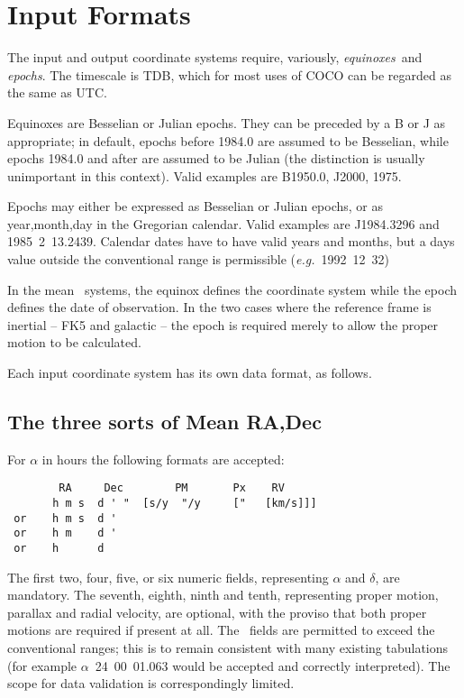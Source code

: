 \section{Input Formats}

The input and output coordinate systems require, variously,
{\it equinoxes}\, and {\it epochs}. The timescale is TDB, which
for most uses of COCO can be regarded as the same as UTC.

Equinoxes are Besselian or Julian epochs.
They can be preceded by a B or J as appropriate; in default,
epochs before 1984.0 are assumed to be Besselian, while epochs
1984.0 and after are assumed to be Julian (the distinction is
usually unimportant in this context). 
Valid examples are B1950.0, J2000, 1975.

Epochs may either be expressed as Besselian or Julian epochs,
or as year,month,day in the Gregorian calendar.
Valid examples are J1984.3296 and 1985~2~13.2439.
Calendar dates have to have valid years and months, but a days
value outside the
conventional range is permissible ({\it e.g.}~1992~12~32)

In the mean \radec\ systems, the equinox defines the coordinate
system while the epoch defines the date of observation.
In the two cases where the reference frame is inertial -- FK5
and galactic -- the epoch is required merely to allow the proper
motion to be calculated.

Each input coordinate system has its own data format, as follows.

\subsection{The three sorts of Mean RA,Dec}

For $\alpha$ in hours the following formats are accepted:
\begin{verbatim}
        RA     Dec        PM       Px    RV
       h m s  d ' "  [s/y  "/y     ["   [km/s]]]
 or    h m s  d '
 or    h m    d '
 or    h      d
\end{verbatim}

The first two, four, five, or six numeric fields, representing
$\alpha$ and $\delta$,
are mandatory. The seventh, eighth, ninth and tenth, representing proper motion,
parallax and radial velocity, are optional, with the proviso
that both proper motions are required if present at all.
The \radec\ fields are permitted to exceed the conventional ranges; this is
to remain consistent with many existing tabulations (for example
$\alpha$~24~00~01.063 would be accepted and correctly interpreted).
The scope for data validation is correspondingly limited.

